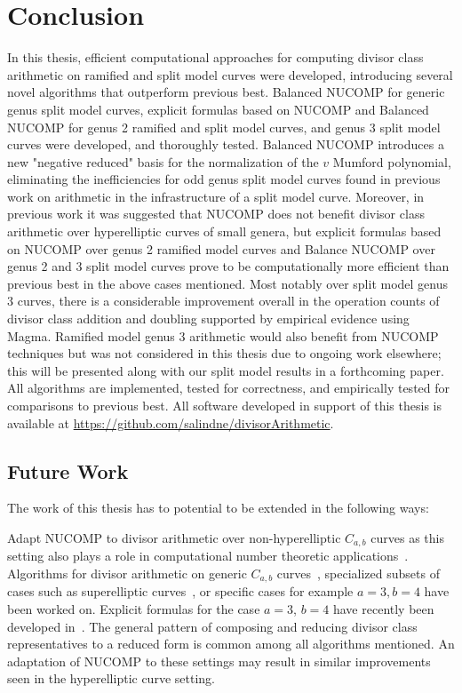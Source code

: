 
\chapter{Conclusion} 
\label{cha:conclusion}
In this thesis, efficient computational approaches for computing divisor class
arithmetic on ramified and split model curves were developed, introducing
several novel algorithms that outperform previous best. Balanced NUCOMP for
generic genus split model curves, explicit formulas based on NUCOMP and Balanced
NUCOMP for genus 2 ramified and split model curves, and genus 3 split model
curves were developed, and thoroughly tested. Balanced NUCOMP introduces a new
"negative reduced" basis for the normalization of the $v$ Mumford polynomial,
eliminating the inefficiencies for odd genus split model curves found in
previous work on arithmetic in the infrastructure of a split model curve. Moreover,
in previous work it was suggested that NUCOMP does not benefit divisor class
arithmetic over hyperelliptic curves of small genera, but explicit formulas
based on NUCOMP over genus 2 ramified model curves and Balance NUCOMP over genus
2 and 3 split model curves prove to be computationally more efficient than
previous best in the above cases mentioned. Most notably over split model genus 3
curves, there is a considerable improvement overall in the operation counts of
divisor class addition and doubling supported by empirical evidence using Magma.
Ramified model genus 3 arithmetic would also benefit from NUCOMP techniques but
was not considered in this thesis due to ongoing work elsewhere; this will be
presented along with our split model results in a forthcoming paper. All
algorithms are implemented, tested for correctness, and empirically tested for
comparisons to previous best. All software developed in support of this thesis
is available at \url{https://github.com/salindne/divisorArithmetic}.


\section{Future Work}
\label{sec:futurework}
The work of this thesis has to potential to be extended in the following ways:

Adapt NUCOMP to divisor arithmetic over non-hyperelliptic $C_{a,b}$ curves as
this setting also plays a role in computational number theoretic
applications~\cite{Sutherland_sato_2016}. Algorithms for divisor arithmetic on
generic $C_{a,b}$ curves~\cite{harasawa2000fast}, specialized subsets of cases
such as superelliptic curves~\cite{shaska_2019}, or specific cases for example
$a = 3, b = 4$ have been worked on. Explicit
formulas for the case  $a=3$, $b=4$ have recently been developed
in~\cite{evan_g3}. The general pattern of composing and reducing divisor class
representatives to a reduced form is common among all algorithms mentioned. An
adaptation of NUCOMP to these settings may result in similar improvements seen
in the hyperelliptic curve setting.

